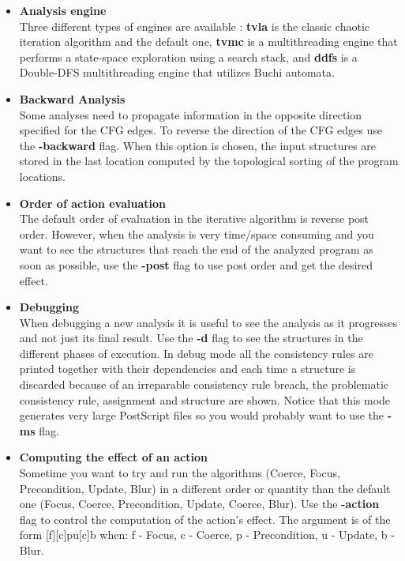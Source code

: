 \begin{itemize}
\item{\textbf{Analysis engine}}\\
Three different types of engines are available : \textbf{tvla} is
the classic chaotic iteration algorithm and the default one,
\textbf{tvmc} is a multithreading engine that performs a
state-space exploration using a search stack, and \textbf{ddfs} is
a Double-DFS multithreading engine that utilizes Buchi automata.

\item{\textbf{Backward Analysis}}\\
Some analyses need to propagate information in the opposite
direction specified for the CFG edges. To reverse the direction of
the CFG edges use the \textbf{-backward} flag. When this option is
chosen, the input structures are stored in the last location
computed by the topological sorting of the program locations.

\item{\textbf{Order of action evaluation}}\\
The default order of evaluation in the iterative algorithm is
reverse post order. However, when the analysis is very time/space
consuming and you want to see the structures that reach the end of
the analyzed program as soon as possible, use the \textbf{-post}
flag to use post order and get the desired effect.

\item{\textbf{Debugging}}\\
When debugging a new analysis it is useful to see the analysis as
it progresses and not just its final result. Use the \textbf{-d}
flag to see the structures in the different phases of execution.
In debug mode all the consistency rules are printed together with
their dependencies and each time a structure is discarded because
of an irreparable consistency rule breach, the problematic
consistency rule, assignment and structure are shown. Notice that
this mode generates very large PostScript files so you would
probably want to use the \textbf{-ms} flag.

\item{\textbf{Computing the effect of an action}}\\
Sometime you want to try and run the algorithms (Coerce, Focus,
Precondition, Update, Blur) in a different order or quantity than
the default one (Focus, Coerce, Precondition, Update, Coerce,
Blur). Use the \textbf{-action
} flag to control the computation of the action's
effect.  The argument is of the form [f][c]pu[c]b when: f - Focus,
c - Coerce, p - Precondition, u - Update, b -
Blur. %


\end{itemize}
